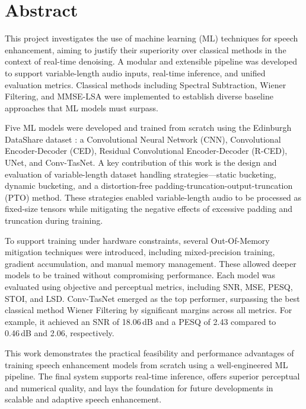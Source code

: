 \chapter*{Abstract}

This project investigates the use of machine learning (ML) techniques for speech enhancement, aiming to justify their superiority over classical methods in the context of real-time denoising. A modular and extensible pipeline was developed to support variable-length audio inputs, real-time inference, and unified evaluation metrics. Classical methods including Spectral Subtraction, Wiener Filtering, and MMSE-LSA were implemented to establish diverse baseline approaches that ML models must surpass.

Five ML models were developed and trained from scratch using the Edinburgh DataShare dataset \cite{edinburghdataset}: a Convolutional Neural Network (CNN), Convolutional Encoder-Decoder (CED), Residual Convolutional Encoder-Decoder (R-CED), UNet, and Conv-TasNet. A key contribution of this work is the design and evaluation of variable-length dataset handling strategies—static bucketing, dynamic bucketing, and a distortion-free padding-truncation-output-truncation (PTO) method. These strategies enabled variable-length audio to be processed as fixed-size tensors while mitigating the negative effects of excessive padding and truncation during training.

To support training under hardware constraints, several Out-Of-Memory mitigation techniques were introduced, including mixed-precision training, gradient accumulation, and manual memory management. These allowed deeper models to be trained without compromising performance. Each model was evaluated using objective and perceptual metrics, including SNR, MSE, PESQ, STOI, and LSD. Conv-TasNet emerged as the top performer, surpassing the best classical method Wiener Filtering by significant margins across all metrics. For example, it achieved an SNR of 18.06 dB and a PESQ of 2.43 compared to 0.46 dB and 2.06, respectively.

This work demonstrates the practical feasibility and performance advantages of training speech enhancement models from scratch using a well-engineered ML pipeline. The final system supports real-time inference, offers superior perceptual and numerical quality, and lays the foundation for future developments in scalable and adaptive speech enhancement.